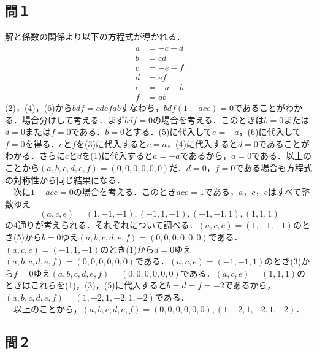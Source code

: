\documentclass[../main]{subfiles}
\begin{document}
\subsection*{問１}
解と係数の関係より以下の方程式が導かれる．
\begin{align}
a&=-c-d\\
b&=cd\\
c&=-e-f\\
d&=ef\\
e&=-a-b\\
f&=ab
\end{align}
(2)，(4)，(6)から$bdf=cdefab$すなわち，$bdf(1-ace)=0$であることがわかる．場合分けして考える．まず$bdf=0$の場合を考える．このときは$b=0$または$d=0$または$f=0$である．$b=0$とする．(5)に代入して$e=-a$，(6)に代入して$f=0$を得る．$e$と$f$を(3)に代入すると$c=a$，(4)に代入すると$d=0$であることがわかる．さらに$c$と$d$を(1)に代入すると$a=-a$であるから，$a=0$である．以上のことから$(a,b,c,d,e,f)=(0,0,0,0,0,0)$だ．$d=0$，$f=0$である場合も方程式の対称性から同じ結果になる．\\
　次に$1-ace=0$の場合を考える．このとき$ace=1$である，$a$，$c$，$e$はすべて整数ゆえ
\begin{equation*}
(a,c,e)=(1,-1,-1),(-1,1,-1),(-1,-1,1),(1,1,1)
\end{equation*}
の4通りが考えられる．それぞれについて調べる．$(a,c,e)=(1,-1,-1)$のとき(5)から$b=0$ゆえ$(a,b,c,d,e,f)=(0,0,0,0,0,0)$である．$(a,c,e)=(-1,1,-1)$のとき(1)から$d=0$ゆえ$(a,b,c,d,e,f)=(0,0,0,0,0,0)$である．$(a,c,e)=(-1,-1,1)$のとき(3)から$f=0$ゆえ$(a,b,c,d,e,f)=(0,0,0,0,0,0)$である．$(a,c,e)=(1,1,1)$のときはこれらを(1)，(3)，(5)に代入すると$b=d=f=-2$であるから，$(a,b,c,d,e,f)=(1,-2,1,-2,1,-2)$である．\\
　以上のことから，$(a,b,c,d,e,f)=(0,0,0,0,0,0),(1,-2,1,-2,1,-2)$．
\subsection*{問２}
\end{document}
